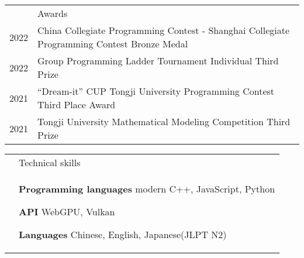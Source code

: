 \documentclass[letterpaper, 11pt]{article}
\newcommand{\headingfont}{\Large\color{OliveGreen}}
\newenvironment{SectionTable}[1]{
	\renewcommand*{\arraystretch}{1.7}
	\setlength{\tabcolsep}{10pt}
	\begin{longtable}{Rp{5.2in}} & #1 \\}
{\end{longtable}\vspace{-.3cm}}
\begin{document}

\begin{SectionTable}{\headingfont Awards}
    2022 &
    China Collegiate Programming Contest - Shanghai Collegiate Programming Contest Bronze Medal \\
    2022 &
    Group Programming Ladder Tournament Individual Third Prize \\
    2021 &
    “Dream-it” CUP Tongji University Programming Contest Third Place Award \\
    2021 &
    Tongji University Mathematical Modeling Competition Third Prize \\
\end{SectionTable}

\begin{SectionTable}{\headingfont Technical skills}
    & \textbf{Programming languages} \newline
    modern C++, JavaScript, Python \newline

    \textbf{API} \newline
    WebGPU, Vulkan \newline

    \textbf{Languages} \newline
    Chinese, English, Japanese(JLPT N2)
\end{SectionTable}



\end{document}
